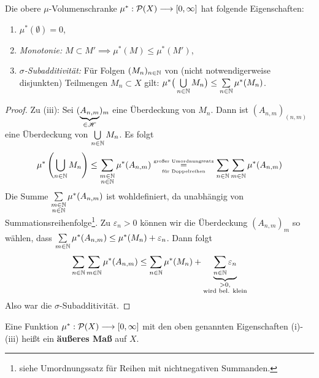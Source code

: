 \begin{lemma}
\begin{mdframed}
Die obere $\mu$-Volumenschranke $\mu^*:\mathcal{P}(X) \longrightarrow [0,\infty]$ hat folgende Eigenschaften:
\begin{enumerate}[label=(\roman*),topsep=3pt, itemsep=0pt]
	\item $\mu^*(\emptyset) = 0$,
	\item \emph{Monotonie:} $M \subset M' \implies \mu^*(M) \leq \mu^*(M')$,
	\item \emph{$\sigma$-Subadditivität:} Für Folgen $(M_n)_{n \in \mathbb{N}}$ von (nicht notwendigerweise disjunkten) Teilmengen $M_n \subset X$ gilt: $\mu^*\big(\bigcup\limits_{n \in \mathbb{N}} M_n \big)\leq \sum\limits_{n\in\mathbb{N}}\mu^*(M_n)$.
\end{enumerate}
\end{mdframed}
\begin{proof}
Zu (iii): Sei $(\underbrace{A_{n,m}}_{\in \mathscr{H}})_m$ eine Überdeckung von $M_n$. Dann ist $(A_{n,m})_{(n,m)}$ eine Überdeckung von $\bigcup\limits_{n \in \mathbb{N}}M_n$. Es folgt
$$
\mu^*\left( \bigcup_{n \in \mathbb{N}} M_n\right) \leq \sum_{\substack{m\in\mathbb{N}\\n\in\mathbb{N}}} \mu^*(A_{n,m}) \underset{\text{\tiny für Doppelreihen}}{\overset{\text{\tiny großer Umordnungssatz}}=}  \sum_{n\in\mathbb{N}}\sum_{m\in\mathbb{N}} \mu^* (A_{n,m})
$$
Die Summe $\sum\limits_{\substack{m\in\mathbb{N}\\n\in\mathbb{N}}} \mu^*(A_{n,m})$ ist wohldefiniert, da unabhängig von Summationsreihenfolge\footnote{siehe Umordnungssatz für Reihen mit nichtnegativen Summanden.}. Zu $\varepsilon_n >0$ können wir die Überdeckung $(A_{n,m})_m$ so wählen, dass $\sum\limits_{m\in \mathbb{N}} \mu^*(A_{n,m}) \leq \mu^*(M_n)+\varepsilon_n$. Dann folgt
$$
\sum_{n\in\mathbb{N}}\sum_{m\in\mathbb{N}} \mu^* (A_{n,m}) \leq \sum_{n \in \mathbb{N}} \mu^*(M_n) + \underbrace{\sum_{n \in \mathbb{N}} \varepsilon_n}_{\substack{>0, \\ \text{wird bel. klein}}}
$$
Also war die $\sigma$-Subadditivität.
\end{proof}
\end{lemma}

\begin{definition}
\begin{mdframed}
Eine Funktion $\mu^*: \mathcal{P}(X) \longrightarrow [0,\infty]$ mit den oben genannten Eigenschaften (i)-(iii) heißt ein \textbf{äußeres Maß} auf $X$.
\end{mdframed}
\end{definition}

